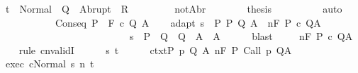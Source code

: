 \begin{isabellebody}
\ {\isachardoublequoteopen}t\ {\isasymin}\ Normal\ {\isacharbackquote}\ Q\ {\isasymunion}\ Abrupt\ {\isacharbackquote}\ R{\isachardoublequoteclose}\ \isacommand{{\isachardot}}\isamarkupfalse%
\isanewline
\ \ \ \ \ \ \isamarkupfalse%
\ notAbr\isanewline
\ \ \ \ \ \ \isamarkupfalse%
\ {\isacharquery}thesis\isanewline
\ \ \ \ \ \ \ \ \isamarkupfalse%
\ auto\isanewline
\ \ \ \ \isamarkupfalse%
\isanewline
\ \ \isamarkupfalse%
\isanewline
{}\isamarkupfalse%
\isanewline
\ \ \isamarkupfalse%
\ {\isacharparenleft}Conseq\ P\ {\isasymTheta}\ F\ c\ Q\ A{\isacharparenright}\isanewline
\ \ \isamarkupfalse%
\ adapt{\isacharcolon}\ {\isachardoublequoteopen}{\isasymforall}s\ {\isasymin}\ P{\isachardot}\ {\isacharparenleft}{\isasymexists}P{\isacharprime}\ Q{\isacharprime}\ A{\isacharprime}{\isachardot}\ {\isasymGamma}{\isacharcomma}{\isasymTheta}\ {\isasymTurnstile}n{\isacharcolon}\isactrlbsub {\isacharslash}F\isactrlesub \ P{\isacharprime}\ c\ Q{\isacharprime}{\isacharcomma}A{\isacharprime}\ \ {\isasymand}\isanewline
\ \ \ \ \ \ \ \ \ \ \ \ \ \ \ \ \ \ \ \ \ \ \ \ \ \ s\ {\isasymin}\ P{\isacharprime}\ {\isasymand}\ Q{\isacharprime}\ {\isasymsubseteq}\ Q\ {\isasymand}\ A{\isacharprime}\ {\isasymsubseteq}\ A{\isacharparenright}{\isachardoublequoteclose}\isanewline
\ \ \ \ \isamarkupfalse%
\ blast\isanewline
\ \ \isamarkupfalse%
\ {\isachardoublequoteopen}{\isasymGamma}{\isacharcomma}{\isasymTheta}\ {\isasymTurnstile}n{\isacharcolon}\isactrlbsub {\isacharslash}F\isactrlesub \ P\ c\ Q{\isacharcomma}A{\isachardoublequoteclose}\isanewline
\ \ \isamarkupfalse%
\ {\isacharparenleft}rule\ cnvalidI{\isacharparenright}\isanewline
\ \ \ \ \isamarkupfalse%
\ s\ t\isanewline
\ \ \ \ \isamarkupfalse%
\ ctxt{\isacharcolon}{\isachardoublequoteopen}{\isasymforall}{\isacharparenleft}P{\isacharcomma}\ p{\isacharcomma}\ Q{\isacharcomma}\ A{\isacharparenright}{\isasymin}{\isasymTheta}{\isachardot}\ {\isasymGamma}{\isasymTurnstile}n{\isacharcolon}\isactrlbsub {\isacharslash}F\isactrlesub \ P\ {\isacharparenleft}Call\ p{\isacharparenright}\ Q{\isacharcomma}A{\isachardoublequoteclose}\isanewline
\ \ \ \ \isamarkupfalse%
\ exec{\isacharcolon}\ {\isachardoublequoteopen}{\isasymGamma}{\isasymturnstile}{\isasymlangle}c{\isacharcomma}Normal\ s{\isasymrangle}\ {\isacharequal}n{\isasymRightarrow}\ t{\isachardoublequoteclose}\isanewline
\ \ \ \ \isamarkupfalse%

\end{isabellebody}
